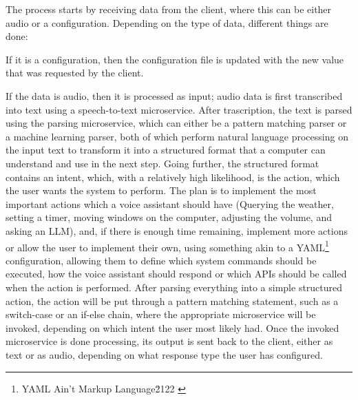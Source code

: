 The process starts by receiving data from the client, where this can be either audio or a configuration.
Depending on the type of data, different things are done:

If it is a configuration, then the configuration file is updated with the new value that was requested by the client.

If the data is audio, then it is processed as input; audio data is first transcribed into text using a speech-to-text microservice.
After trascription, the text is parsed using the parsing microservice, which can either be a pattern matching parser or a machine learning parser,
both of which perform natural language processing on the input text to transform it into a structured format that a computer can understand and use in the next step.
Going further, the structured format contains an intent, which, with a relatively high likelihood, is the action, which the user wants the system to perform.
The plan is to implement the most important actions which a voice assistant should have
(Querying the weather, setting a timer, moving windows on the computer, adjusting the volume, and asking an LLM), and, if there is enough time remaining, implement more actions
or allow the user to implement their own, using something akin to a YAML\footnote{YAML Ain't Markup Language\u2122 \cite{yaml}} configuration, allowing them to define
which system commands should be executed, how the voice assistant should respond or which APIs should be called when the action is performed.
After parsing everything into a simple structured action, the action will be put through a pattern matching statement, such as a switch-case or an if-else chain,
where the appropriate microservice will be invoked, depending on which intent the user most likely had.
Once the invoked microservice is done processing, its output is sent back to the client, either as text or as audio, depending on what response type the user has configured.
